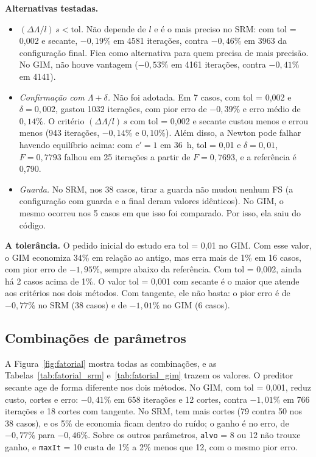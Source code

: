 \documentclass[11pt,a4paper]{article}
\numberwithin{equation}{section}
\begin{document}
\textbf{Alternativas testadas.}
\begin{itemize}
\item \emph{$(\Delta\Lambda/l)\,s < \mathrm{tol}$.} Não depende de $l$ e é o mais preciso no SRM: com tol = 0,002 e secante, $-0{,}19\%$ em 4581 iterações, contra $-0{,}46\%$ em 3963 da configuração final. Fica como alternativa para quem precisa de mais precisão. No GIM, não houve vantagem ($-0{,}53\%$ em 4161 iterações, contra $-0{,}41\%$ em 4141).
\item \emph{Confirmação com $\Lambda + \delta$.} Não foi adotada. Em 7 casos, com tol = 0,002 e $\delta = 0{,}002$, gastou 1032 iterações, com pior erro de $-0{,}39\%$ e erro médio de $0{,}14\%$. O critério $(\Delta\Lambda/l)\,s$ com tol = 0,002 e secante custou menos e errou menos (943 iterações, $-0{,}14\%$ e $0{,}10\%$). Além disso, a Newton pode falhar havendo equilíbrio acima: com $c' = 1$ em 36~h, tol = 0,01 e $\delta = 0{,}01$, $F = 0{,}7793$ falhou em 25 iterações a partir de $F = 0{,}7693$, e a referência é 0,790.
\item \emph{Guarda.} No SRM, nos 38 casos, tirar a guarda não mudou nenhum FS (a configuração com guarda e a final deram valores idênticos). No GIM, o mesmo ocorreu nos 5 casos em que isso foi comparado. Por isso, ela saiu do código.
\end{itemize}

\textbf{A tolerância.} O pedido inicial do estudo era tol = 0,01 no GIM. Com esse valor, o GIM economiza 34\% em relação ao antigo, mas erra mais de 1\% em 16 casos, com pior erro de $-1{,}95\%$, sempre abaixo da referência. Com tol = 0,002, ainda há 2 casos acima de 1\%. O valor tol = 0,001 com secante é o maior que atende aos critérios nos dois métodos. Com tangente, ele não basta: o pior erro é de $-0{,}77\%$ no SRM (38 casos) e de $-1{,}01\%$ no GIM (6 casos).

\subsection{Combinações de parâmetros}\label{sec:combinacoes}

A Figura~\ref{fig:fatorial} mostra todas as combinações, e as Tabelas~\ref{tab:fatorial_srm} e~\ref{tab:fatorial_gim} trazem os valores. O preditor secante age de forma diferente nos dois métodos. No GIM, com tol = 0,001, reduz custo, cortes e erro: $-0{,}41\%$ em 658 iterações e 12 cortes, contra $-1{,}01\%$ em 766 iterações e 18 cortes com tangente. No SRM, tem mais cortes (79 contra 50 nos 38 casos), e os 5\% de economia ficam dentro do ruído; o ganho é no erro, de $-0{,}77\%$ para $-0{,}46\%$. Sobre os outros parâmetros, \texttt{alvo} = 8 ou 12 não trouxe ganho, e \texttt{maxIt} = 10 custa de 1\% a 2\% menos que 12, com o mesmo pior erro.
\end{document}
